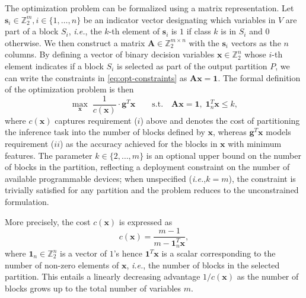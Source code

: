 \documentclass[journal]{IEEEtran}
\theoremstyle{plain} %
\newcommand{\ie}{\textit{i.e.},\xspace}
\begin{document}
The optimization problem can be formalized using a matrix representation.
Let $\pmb{s}_i \in \mathbb{Z}_2^m, i \in \{1,\dots,n\}$ be an indicator vector designating which variables in $V$ are part of a block $S_i$, \ie the $k$-th element of $\pmb{s}_i$ is $1$ if class $k$ is in $S_i$ and $0$ otherwise. We then construct a matrix $\pmb{A} \in \mathbb{Z}_2^{m \times n}$ with the $\pmb{s}_i$ vectors as the $n$ columns.
By defining a vector of binary decision variables $\pmb{x} \in \mathbb{Z}_2^n$ whose $i$-th element indicates if a block $S_i$ is selected as part of the output partition $P$, we can write the constraints in \eqref{eq:opt-constraints} as $\pmb{Ax}=\pmb{1}$.
%
The formal definition of the optimization problem is then
\begin{equation}
\max_{\pmb{x}} \; \frac{1}{c(\pmb{x})}\cdot\pmb{g}^T\pmb{x} \qquad \text{s.t.} \quad \pmb{Ax}=\pmb{1},\; \pmb{1}_n^T\pmb{x} \leq k,
\label{eq:opt-objective}
\end{equation}
where $c(\pmb{x})$ captures requirement ($i$) above and denotes the cost of partitioning the inference task into the number of blocks defined by $\pmb{x}$, whereas $\pmb{g}^T\pmb{x}$ models requirement ($ii$) as the accuracy achieved for the blocks in $\pmb{x}$ with minimum features.
The parameter $k \in \{2, \dots, m\}$ is an optional upper bound on the number of blocks in the partition, reflecting a deployment constraint on the number of available programmable devices; when unspecified (\ie $k=m$), the constraint is trivially satisfied for any partition and the problem reduces to the unconstrained formulation.

More precisely, the cost $c(\pmb{x})$ is expressed as
\begin{equation}
    c(\pmb{x})=\frac{m-1}{m-\pmb{1}_n^T\pmb{x}},
    \label{eq:opt-cost}
\end{equation}
where $\pmb{1}_n\in\mathbb{Z}_2^n$ is a vector of $1$'s hence $\pmb{1}^T\pmb{x}$ is a scalar corresponding to the number of non-zero elements of $\pmb{x}$, \ie the number of blocks in the selected partition. This entails a linearly decreasing advantage $1/c(\pmb{x})$ as the number of blocks grows up to the total number of variables $m$.
\end{document}
